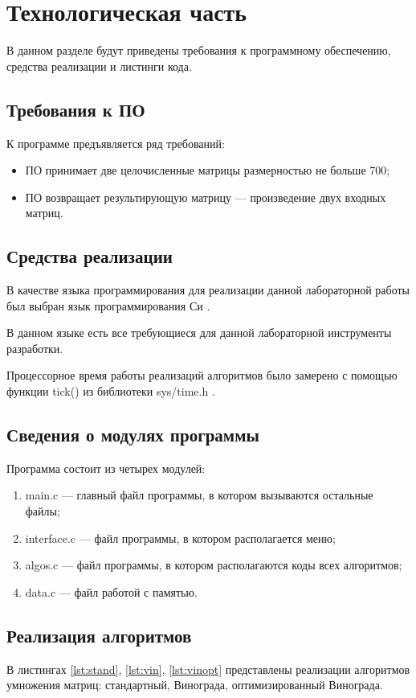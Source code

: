 \chapter{Технологическая часть}

В данном разделе будут приведены требования к программному обеспечению, средства реализации и листинги кода.

\section{Требования к ПО}

К программе предъявляется ряд требований:
\begin{itemize}
	\item ПО принимает две целочисленные матрицы размерностью не больше 700;
	\item ПО возвращает результирующую матрицу --- произведение двух входных матриц.
\end{itemize}


\section{Средства реализации}

В качестве языка программирования для реализации данной лабораторной работы был выбран язык программирования Си \cite{pythonlang}. 

В данном языке есть все требующиеся для данной лабораторной инструменты разработки. 

Процессорное время работы реализаций алгоритмов было замерено с помощью функции tick() из библиотеки sys/time.h \cite{pythonlangtime}.

\section{Сведения о модулях программы}
Программа состоит из четырех модулей:
\begin{enumerate}[label=\arabic*)]
	\item main.c --- главный файл программы, в котором вызываются остальные файлы;
	\item interface.c --- файл программы, в котором располагается меню;
	\item algos.c --- файл программы, в котором располагаются коды всех алгоритмов;
	\item data.c --- файл работой с памятью.
\end{enumerate}


\section{Реализация алгоритмов}
В листингах \ref{lst:stand}, \ref{lst:vin}, \ref{lst:vinopt} представлены реализации алгоритмов умножения матриц: стандартный, Винограда, оптимизированный Винограда.

